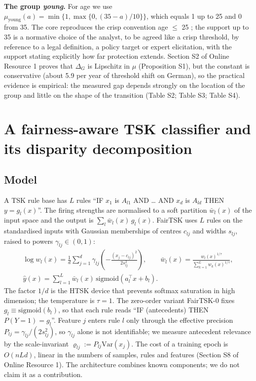 \documentclass[pdflatex,sn-basic,Numbered,lineno]{sn-jnl}
\begin{document}
\textbf{The group \emph{young}.} For age we use \(\mu_{\text{young}}(a) = \min\{1,\max\{0,(35 - a)/10\}\}\), which equals 1 up to 25 and 0 from 35. The core reproduces the crisp convention age \ensuremath{\le} 25 \cite{lequy}; the support up to 35 is a normative choice of the analyst, to be agreed like a crisp threshold, by reference to a legal definition, a policy target or expert elicitation, with the support stating explicitly how far protection extends. Section S2 of Online Resource 1 proves that \(\Delta_G\) is Lipschitz in \(\mu\) (Proposition S1), but the constant is conservative (about 5.9 per year of threshold shift on German), so the practical evidence is empirical: the measured gap depends strongly on the location of the group and little on the shape of the transition (Table S2; Table S3; Table S4).

\hypertarget{a-fairness-aware-tsk-classifier-and-its-disparity-decomposition}{%
\section{A fairness-aware TSK classifier and its disparity decomposition}\label{a-fairness-aware-tsk-classifier-and-its-disparity-decomposition}}

\hypertarget{model}{%
\subsection{Model}\label{model}}

A TSK rule base \cite{tsk} has \(L\) rules ``IF \(x_1\) is \(A_{l1}\) AND \ldots{} AND \(x_d\) is \(A_{ld}\) THEN \(y = g_l(x)\)''. The firing strengths are normalised to a soft partition \(\bar w_l(x)\) of the input space and the output is \(\sum_l \bar w_l(x)\, g_l(x)\). FairTSK uses \(L\) rules on the standardised inputs with Gaussian memberships of centres \(c_{lj}\) and widths \(s_{lj}\), raised to powers \(\gamma_{lj} \in (0,1)\): \[\begin{gathered}\log w_{l}(x) = \frac{1}{d}\sum_{j = 1}^{d}\gamma_{lj}\left(-\frac{(x_{j} - c_{lj})^{2}}{2s_{lj}^{2}}\right),\qquad \bar{w}_{l}(x) = \frac{w_l(x)^{1/\tau}}{\sum_{k = 1}^{L}w_k(x)^{1/\tau}},\\ \hat{y}(x) = \sum_{l = 1}^{L}\bar{w}_{l}(x)\,\mathrm{sigmoid}(a_{l}^{\top}x + b_{l}).\end{gathered} \tag{2}\] The factor \(1/d\) is the HTSK device \cite{htsk} that prevents softmax saturation in high dimension; the temperature is \(\tau = 1\). The zero-order variant FairTSK-0 fixes \(g_l \equiv \mathrm{sigmoid}(b_l)\), so that each rule reads ``IF (antecedents) THEN \(P(Y = 1) = g_l\)''. Feature \(j\) enters rule \(l\) only through the effective precision \(P_{lj} = \gamma_{lj}/(2s_{lj}^2)\), so \(\gamma_{lj}\) alone is not identifiable; we measure antecedent relevance by the scale-invariant \(\varrho_{lj} := P_{lj}\mathrm{Var}(x_j)\). The cost of a training epoch is \(O(nLd)\), linear in the numbers of samples, rules and features (Section S8 of Online Resource 1). The architecture combines known components; we do not claim it as a contribution.
\end{document}
